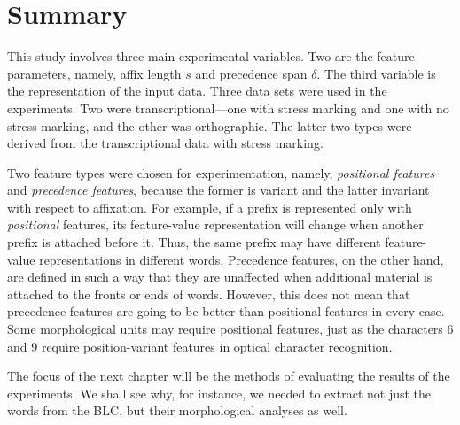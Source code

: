 
\section{Summary}

This study involves three main experimental variables. Two are the feature parameters, namely, affix length $s$ and precedence span $\delta$. The third variable is the representation of the input data. Three data sets were used in the experiments. Two were transcriptional---one with stress marking and one with no stress marking, and the other was orthographic. The latter two types were derived from the transcriptional data with stress marking. 

Two feature types were chosen for experimentation, namely, \emph{positional features} and \emph{precedence features},
because the former is variant and the latter invariant with respect to affixation. For example, if a prefix is represented only with \emph{positional} features, its feature-value representation will change when another prefix is attached before it. Thus, the same prefix may have different feature-value representations in different words. Precedence features, on the other hand, are defined in such a way that they are unaffected when additional material is attached to the fronts or ends of words. However, this does not mean that precedence features are going to be better than positional features in every case. Some morphological units may require positional features, just as the characters \textsf{6} and \textsf{9} require position-variant features in optical character recognition. 

The focus of the next chapter will be the methods of evaluating the results of the experiments. We shall see why, for instance, we needed to extract not just the words from the BLC, but their morphological analyses as well.